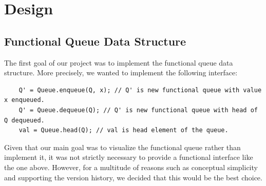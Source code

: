 \documentclass[runningheads]{llncs}
\begin{document}



% 

\section{Design}

\subsection{Functional Queue Data Structure}

The first goal of our project was to implement the functional queue data structure. More precisely, we wanted to implement the following interface:
\begin{verbatim}
    Q' = Queue.enqueue(Q, x); // Q' is new functional queue with value x enqueued.
    Q' = Queue.dequeue(Q); // Q' is new functional queue with head of Q dequeued.
    val = Queue.head(Q); // val is head element of the queue.
\end{verbatim}


Given that our main goal was to visualize the functional queue rather than implement it, it was not strictly necessary to provide a functional interface like the one above. However, for a multitude of reasons such as conceptual simplicity and supporting the version history, we decided that this would be the best choice. 
\end{document}
